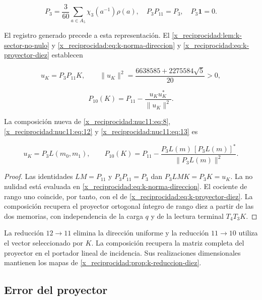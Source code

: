 \begin{equation}
P_3=\frac3{60}\sum_{a\in A_5}\chi_3(a^{-1})\rho(a),
\quad P_3P_{11}=P_3,\quad P_3\mathbf1=0.
\label{x_reciprocidad:nuc11:eq:12}
\end{equation}



El registro generado precede a esta representación.
El \cref{x_reciprocidad:lem:k-sector-no-nulo} y
\eqref{x_reciprocidad:eq:k-norma-direccion} y \eqref{x_reciprocidad:eq:k-proyector-diez} establecen



\[
u_K=P_3P_{11}K,\qquad
\|u_K\|^2=\frac{6638585+2275584\sqrt5}{20}>0,
\]





\begin{equation}
P_{10}(K)=P_{11}-\frac{u_Ku_K^*}{\|u_K\|^2}.
\label{x_reciprocidad:nuc11:eq:13}
\end{equation}



La composición nueva de \eqref{x_reciprocidad:nuc11:eq:8}, \eqref{x_reciprocidad:nuc11:eq:12} y \eqref{x_reciprocidad:nuc11:eq:13} es



\begin{equation}
\boxed{
u_K=P_3L(m_0,m_1),\qquad
P_{10}(K)=P_{11}-
\frac{P_3L(m)\,[P_3L(m)]^*}{\|P_3L(m)\|^2}.
}
\label{x_reciprocidad:nuc11:eq:14}
\end{equation}



\begin{proof}
Las identidades \(LM=P_{11}\) y \(P_3P_{11}=P_3\) dan
\(P_3LMK=P_3K=u_K\).
La no nulidad está evaluada en \eqref{x_reciprocidad:eq:k-norma-direccion}.
El cociente de rango uno coincide, por tanto, con el de
\eqref{x_reciprocidad:eq:k-proyector-diez}.
La composición recupera el proyector ortogonal íntegro de rango
diez a partir de las dos memorias, con independencia de la carga
\(q\) y de la lectura terminal \(T_4T_3K\).
\end{proof}

La reducción \(12\to11\) elimina la dirección uniforme y la
reducción \(11\to10\) utiliza el vector seleccionado por \(K\).
La composición recupera la matriz completa del proyector en el
portador lineal de incidencia.
Sus realizaciones dimensionales mantienen los mapas de
\cref{x_reciprocidad:prop:k-reduccion-diez}.

\subsection{Error del proyector}

